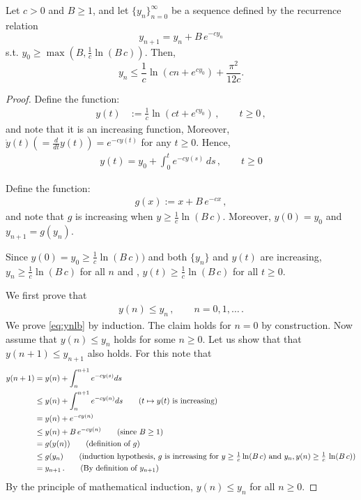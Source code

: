 \begin{lemma}
Let $c > 0$ and $B \geq 1$, and let $\{y_n\}_{n=0}^\infty$ be a sequence defined by the recurrence relation
\[
y_{n+1} = y_n + B \, e^{-c y_n}
\]
s.t. $y_0 \ge \max(B,\frac{1}{c}\ln (B \, c))$. Then, 
\[
y_n \leq \frac{1}{c} \ln(c n + e^{c y_0} ) + \frac{\pi^2}{12c}.
\]
\label{lemma:partial-sum-bound}
\end{lemma}

\begin{proof}
Define the  function:
\begin{align*}
    y(t) & := \frac1{c} \ln(c t + e^{c y_0} )\,, \qquad t\ge 0\,,
\end{align*}
and note that it is an increasing function, Moreover, $\dot y(t) (= \frac{d}{dt} y(t)) = e^{-c y(t)}$ for any $t \ge 0$. Hence,
\begin{align*}
y(t) = y_0 + \int_0^t e^{-c y(s)} \, ds\,, \qquad t\ge 0
\end{align*}

Define the function:
\begin{align*}
g(x) := x + B \, e^{-cx}\,,
\end{align*}
and note that $g$ is increasing when $y\ge \frac{1}{c} \ln (B \,c)$. Moreover, $y(0) = y_0$ and $y_{n+1} = g(y_n)$. 

Since $y(0) = y_0 \ge \frac{1}{c} \ln (B \,c))$ and both $\{y_n\}$ and $y(t)$ are increasing, $y_n \geq \frac{1}{c} \ln (B \, c)$ for all $n$ and , $y(t) \geq \frac{1}{c} \ln (B \, c)$ for all $t \geq 0$.

We first prove that
\begin{align}
    y(n)\le y_n\,, \qquad n=0,1,\dots\,.
    \label{eq:ynlb}
\end{align}
We prove \cref{eq:ynlb} by induction. The claim holds for $n=0$ by construction. Now assume that $y(n)\le y_n$ holds 
for some $n\ge 0$. Let us show that that $y(n+1)\le y_{n+1}$ also holds. For this note that
\begin{align*}
    y(n+1) 
    &=      y(n) + \int_n^{n+1} e^{-c y(s)} ds \\
    &\le    y(n) + \int_n^{n+1} e^{-c y(n)} ds  \tag{$t\mapsto y(t)$ is increasing}\\
    &=      y(n) + e^{-c y(n)} \\
    & \leq  y(n) + B \, e^{-c y(n)} \tag{since $B \geq 1$} \\
    &=   g(y(n)) \tag{definition of $g$} \\
    &\le    g(y_n) \tag{induction hypothesis, $g$ is increasing for $y\ge \frac{1}{c} \ln (B \,c)$ and $y_n, y(n) \ge \frac{1}{c} \, \ln (B \, c)$} \\
    &=      y_{n+1}\,. \tag{By definition of $y_{n+1}$}
\end{align*}    
By the principle of mathematical induction, $y(n) \le y_{n}$ for all $n \ge 0$.


\end{proof}
